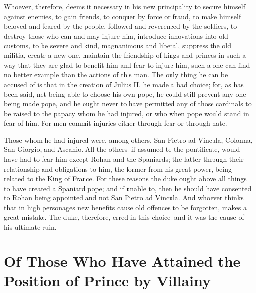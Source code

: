 \documentclass[12pt,letterpaper]{memoir}
\begin{document}
Whoever, therefore, deems it necessary in his new principality to
secure himself against enemies, to gain friends, to conquer by force
or fraud, to make himself beloved and feared by the people, followed
and reverenced by the soldiers, to destroy those who can and may injure
him, introduce innovations into old customs, to be severe and kind,
magnanimous and liberal, suppress the old militia, create a new one,
maintain the friendship of kings and princes in such a way that they
are glad to benefit him and fear to injure him, such a one can find no
better example than the actions of this man. The only thing he can be
accused of is that in the creation of Julius II. he made a bad choice;
for, as has been said, not being able to choose his own pope, he could
still prevent any one being made pope, and he ought never to have
permitted any of those cardinals to be raised to the papacy whom he had
injured, or who when pope would stand in fear of him. For men commit
injuries either through fear or through hate.

Those whom he had injured were, among others, San Pietro ad Vincula,
Colonna, San Giorgio, and Ascanio. All the others, if assumed to the
pontificate, would have had to fear him except Rohan and the Spaniards;
the latter through their relationship and obligations to him, the
former from his great power, being related to the King of France.
For these reasons the duke ought above all things to have created a
Spaniard pope; and if unable to, then he should have consented to Rohan
being appointed and not San Pietro ad Vincula. And whoever thinks that
in high personages new benefits cause old offences to be forgotten,
makes a great mistake. The duke, therefore, erred in this choice, and
it was the cause of his ultimate ruin.

\chapter{Of Those Who Have Attained the Position of Prince by Villainy}
\end{document}
